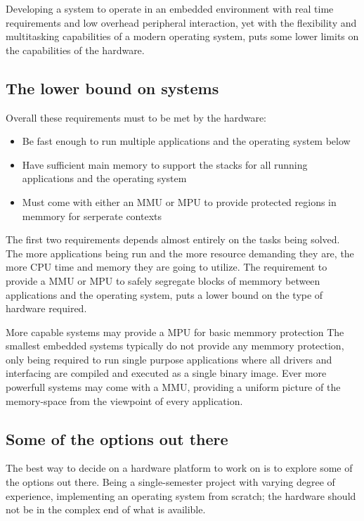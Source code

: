 Developing a system to operate in an embedded environment with real time requirements
and low overhead peripheral interaction,
yet with the flexibility and multitasking capabilities of a modern operating system,
puts some lower limits on the capabilities of the hardware.

\subsection{The lower bound on systems}
Overall these requirements must to be met by the hardware:
\begin{itemize}
	\item Be fast enough to run multiple applications and the operating system below
	\item Have sufficient main memory to support the stacks for all running applications and the operating system
	\item Must come with either an MMU or MPU to provide protected regions in memmory for serperate contexts
\end{itemize}

The first two requirements depends almost entirely on the tasks being solved.
The more applications being run and the more resource demanding they are,
the more CPU time and memory they are going to utilize.
The requirement to provide a MMU or MPU to safely segregate blocks of memmory between applications and the operating system,
puts a lower bound on the type of hardware required.

More capable systems may provide a MPU for basic memmory protection
The smallest embedded systems typically do not provide any memmory protection,
only being required to run single purpose applications where all drivers and interfacing
are compiled and executed as a single binary image.
Ever more powerfull systems may come with a MMU,
providing a uniform picture of the memory-space from the viewpoint of every application.

\subsection{Some of the options out there}
The best way to decide on a hardware platform to work on is to explore some of the options out there.
Being a single-semester project with varying degree of experience,
implementing an operating system from scratch;
the hardware should not be in the complex end of what is availible.

